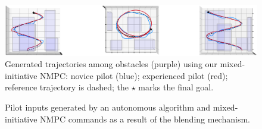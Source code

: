 \begin{figure}[t]
	\centering
	\includegraphics[width=\textwidth]{figures/plot_3D}
	\vspace{-0.5cm}
	\caption{Generated trajectories among obstacles (purple) using our mixed-initiative NMPC: novice pilot (blue); experienced pilot (red); reference trajectory is dashed; the $\star$ marks the final goal.}\label{fig:output}%
\end{figure}
\begin{figure}[t]
\centering
{} 
\caption{Pilot inputs generated by an autonomous algorithm and mixed-initiative NMPC commands as a result of the blending mechanism.}\label{fig:human_inputs_s1}%
\end{figure}

